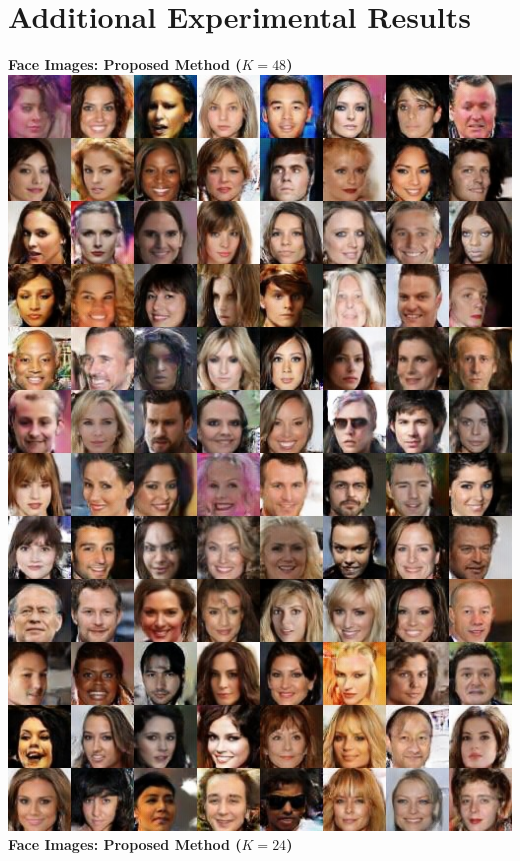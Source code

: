 \documentclass{article}
\begin{document}
\clearpage
\section{Additional Experimental Results}

\textbf{Face Images: Proposed Method ($K=48$)}\\
\includegraphics[width=1.0\textwidth]{Figs/sup/fk48.jpg}\\
\clearpage
\textbf{Face Images: Proposed Method ($K=24$)}\\
\end{document}
